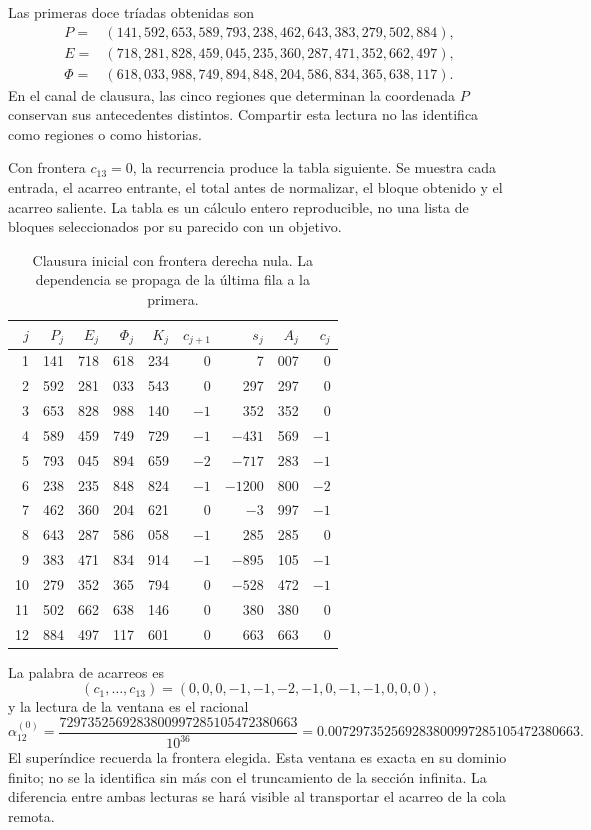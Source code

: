 Las primeras doce tríadas obtenidas son
\begin{align*}
 P={}&(141,592,653,589,793,238,462,643,383,279,502,884),\\
 E={}&(718,281,828,459,045,235,360,287,471,352,662,497),\\
 \Phi={}&(618,033,988,749,894,848,204,586,834,365,638,117).
\end{align*}
En el canal de clausura, las cinco regiones que determinan la coordenada
\(P\) conservan sus antecedentes distintos. Compartir esta lectura no
las identifica como regiones o como historias.

Con frontera \(c_{13}=0\), la recurrencia produce la tabla siguiente.
Se muestra cada entrada, el acarreo entrante, el total antes de normalizar,
el bloque obtenido y el acarreo saliente. La tabla es un cálculo entero
reproducible, no una lista de bloques seleccionados por su parecido con
un objetivo.

\begin{table}[htbp]
\centering
\small
\setlength{\tabcolsep}{3.5pt}
\begin{tabular}{r|rrrr|rr|rr}
\hline
\(j\)&\(P_j\)&\(E_j\)&\(\Phi_j\)&\(K_j\)&\(c_{j+1}\)&\(s_j\)&\(A_j\)&\(c_j\)\\
\hline
1&141&718&618&234&0&7&007&0\\
2&592&281&033&543&0&297&297&0\\
3&653&828&988&140&\(-1\)&352&352&0\\
4&589&459&749&729&\(-1\)&\(-431\)&569&\(-1\)\\
5&793&045&894&659&\(-2\)&\(-717\)&283&\(-1\)\\
6&238&235&848&824&\(-1\)&\(-1200\)&800&\(-2\)\\
7&462&360&204&621&0&\(-3\)&997&\(-1\)\\
8&643&287&586&058&\(-1\)&285&285&0\\
9&383&471&834&914&\(-1\)&\(-895\)&105&\(-1\)\\
10&279&352&365&794&0&\(-528\)&472&\(-1\)\\
11&502&662&638&146&0&380&380&0\\
12&884&497&117&601&0&663&663&0\\
\hline
\end{tabular}
\caption{Clausura inicial con frontera derecha nula. La dependencia se propaga de la última fila a la primera.}
\label{tab:alpha-ventana}
\end{table}

La palabra de acarreos es
\[
 (c_1,\ldots,c_{13})=(0,0,0,-1,-1,-2,-1,0,-1,-1,0,0,0),
\]
y la lectura de la ventana es el racional
\begin{equation}
 \alpha_{12}^{(0)}
 =\frac{7297352569283800997285105472380663}{10^{36}}
 =0.007297352569283800997285105472380663.
 \label{eq:alpha-ventana-cero}
\end{equation}
El superíndice recuerda la frontera elegida. Esta ventana es exacta en su
dominio finito; no se la identifica sin más con el truncamiento de la
sección infinita. La diferencia entre ambas lecturas se hará visible al
transportar el acarreo de la cola remota.


